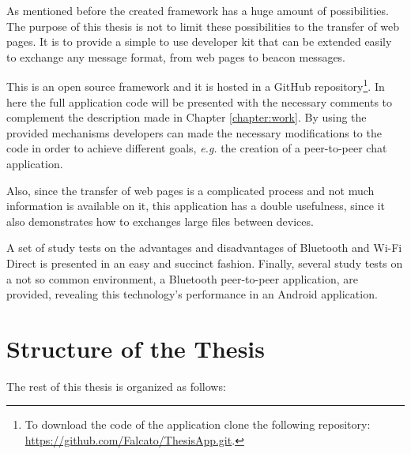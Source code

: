 As mentioned before the created framework has a huge amount of possibilities. The purpose of this thesis is not to limit these possibilities to the transfer of web pages. It is to provide a simple to use developer kit that can be extended easily to exchange any message format, from web pages to beacon messages.

This is an open source framework and it is hosted in a GitHub repository\footnote{To download the code of the application clone the following repository: \url{https://github.com/Falcato/ThesisApp.git}.}. In here the full application code will be presented with the necessary comments to complement the description made in Chapter \ref{chapter:work}. By using the provided mechanisms developers can made the necessary modifications to the code in order to achieve different goals, \textit{e.g.} the creation of a peer-to-peer chat application.

Also, since the transfer of web pages is a complicated process and not much information is available on it, this application has a double usefulness, since it also demonstrates how to exchanges large files between devices.

A set of study tests on the advantages and disadvantages of Bluetooth and Wi-Fi Direct is presented in an easy and succinct fashion. Finally, several study tests on a not so common environment, a Bluetooth peer-to-peer application, are provided, revealing this technology's performance in an Android application.

\section{Structure of the Thesis}

The rest of this thesis is organized as follows:

